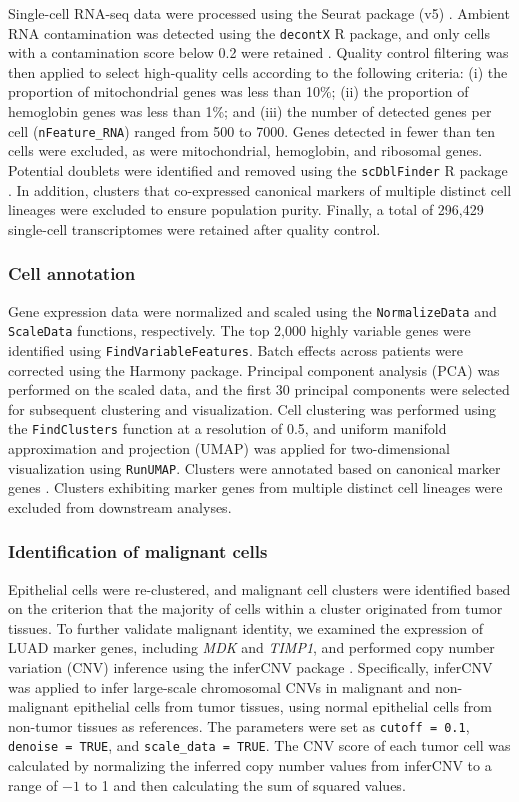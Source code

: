 \documentclass[pdflatex,sn-mathphys-num]{sn-jnl}%
\theoremstyle{thmstyleone}%
\theoremstyle{thmstyletwo}%
\theoremstyle{thmstylethree}%
\begin{document}
Single-cell RNA-seq data were processed using the Seurat package (v5) \cite{bib30}. Ambient RNA contamination was detected using the \texttt{decontX} R package, and only cells with a contamination score below 0.2 were retained \cite{bib31}. Quality control filtering was then applied to select high-quality cells according to the following criteria: (i) the proportion of mitochondrial genes was less than 10\%; (ii) the proportion of hemoglobin genes was less than 1\%; and (iii) the number of detected genes per cell (\texttt{nFeature\_RNA}) ranged from 500 to 7000. Genes detected in fewer than ten cells were excluded, as were mitochondrial, hemoglobin, and ribosomal genes. Potential doublets were identified and removed using the \texttt{scDblFinder} R package \cite{bib32}. In addition, clusters that co-expressed canonical markers of multiple distinct cell lineages were excluded to ensure population purity. Finally, a total of 296,429 single-cell transcriptomes were retained after quality control.

\subsubsection{Cell annotation}

Gene expression data were normalized and scaled using the \texttt{NormalizeData} and \texttt{ScaleData} functions, respectively. The top 2,000 highly variable genes were identified using \texttt{FindVariableFeatures}. Batch effects across patients were corrected using the Harmony package. Principal component analysis (PCA) was performed on the scaled data, and the first 30 principal components were selected for subsequent clustering and visualization. Cell clustering was performed using the \texttt{FindClusters} function at a resolution of 0.5, and uniform manifold approximation and projection (UMAP) was applied for two-dimensional visualization using \texttt{RunUMAP}. Clusters were annotated based on canonical marker genes \cite{bib29}. Clusters exhibiting marker genes from multiple distinct cell lineages were excluded from downstream analyses.

\subsubsection{Identification of malignant cells}

Epithelial cells were re-clustered, and malignant cell clusters were identified based on the criterion that the majority of cells within a cluster originated from tumor tissues. To further validate malignant identity, we examined the expression of LUAD marker genes, including \textit{MDK} and \textit{TIMP1}, and performed copy number variation (CNV) inference using the inferCNV package \cite{bib33}. Specifically, inferCNV was applied to infer large-scale chromosomal CNVs in malignant and non-malignant epithelial cells from tumor tissues, using normal epithelial cells from non-tumor tissues as references. The parameters were set as \texttt{cutoff = 0.1}, \texttt{denoise = TRUE}, and \texttt{scale\_data = TRUE}. The CNV score of each tumor cell was calculated by normalizing the inferred copy number values from inferCNV to a range of $-1$ to 1 and then calculating the sum of squared values.
\end{document}
